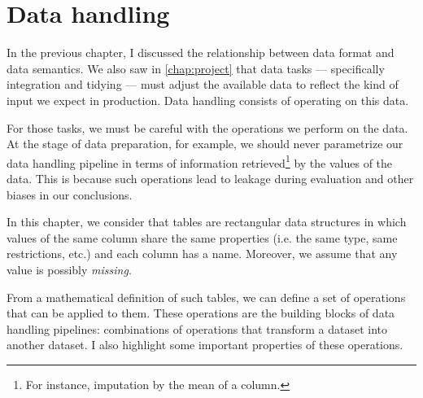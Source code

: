 \chapter{Data handling}
\label{chap:handling}



In the previous chapter, I discussed the relationship between data format and data
semantics.  We also saw in \cref{chap:project} that data tasks --- specifically
integration and tidying --- must adjust the available data to reflect the kind of
input we expect in production.  Data handling consists of operating on this data.

For those tasks, we must be careful with the operations we perform on the data. At the
stage of data preparation, for example, we should never parametrize our data handling
pipeline in terms of information retrieved\footnote{For instance, imputation by the mean
of a column.} by the values of the data.  This is because such operations lead to \gls{leakage}
during evaluation and other biases in our conclusions.

In this chapter, we consider that tables are rectangular data structures in which values
of the same column share the same properties (i.e. the same type, same restrictions, etc.)
and each column has a name.  Moreover, we assume that any value is possibly
\emph{missing}.

From a mathematical definition of such tables, we can define a set of operations that can
be applied to them.  These operations are the building blocks of data handling pipelines:
combinations of operations that transform a dataset into another dataset.
I also highlight some important properties of these operations.

